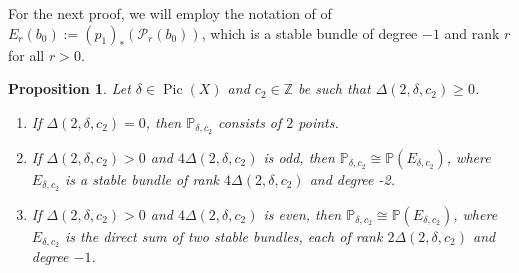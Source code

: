 \documentclass{article}[12pt]
\newtheorem{proposition}[theorem]{Proposition}
\theoremstyle{definition}
\theoremstyle{remark}
\newcommand \Z{\mathbb Z}
\numberwithin{equation}{section}
\newcommand \mc{\mathcal}
\newcommand \mb{\mathbb}
\DeclareMathOperator{\Pic}{Pic}
\begin{document}
For the next proof, we will employ the notation of \cite{CatCil} of $E_r(b_0) := (p_1)_*(\mc{P}_{r}(b_0))$, which is a stable bundle of degree $-1$ and rank $r$ for all $r>0$.
\begin{proposition}\label{spectral} Let $\delta\in \Pic(X)$ and $c_2\in \Z$ be such that $\Delta(2,\delta,c_2)\geq 0$.
	\begin{enumerate}
		\item[i.] If $\Delta(2,\delta,c_2)=0$, then $\mb{P}_{\delta,c_2}$ consists of $2$ points.
		\item[ii.] If $\Delta(2,\delta,c_2)>0$ and $4\Delta(2,\delta,c_2)$ is odd, then $\mb{P}_{\delta,c_2}\cong \mb{P}(E_{\delta,c_2})$, where $E_{\delta,c_2}$ is a stable bundle of rank $4\Delta(2,\delta,c_2)$ and degree -2.
		\item[iii.] If $\Delta(2,\delta,c_2)>0$ and $4\Delta(2,\delta,c_2)$ is even, then $\mb{P}_{\delta,c_2}\cong \mb{P}(E_{\delta,c_2})$, where $E_{\delta,c_2}$ is the direct sum of two stable bundles, each of rank $2\Delta(2,\delta,c_2)$ and degree $-1$.
	\end{enumerate}
\end{proposition}
\end{document}
